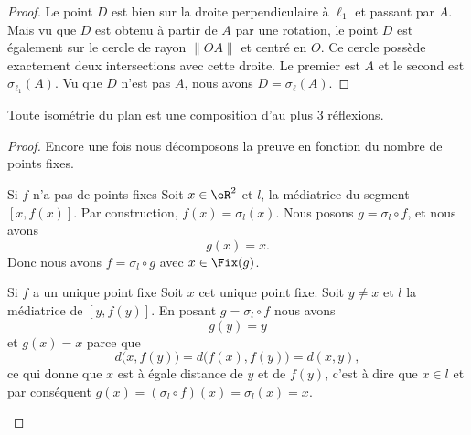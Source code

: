\begin{proof}
    Le point \( D\) est bien sur la droite perpendiculaire à \( \ell_1\) et passant par \( A\). Mais vu que \( D\) est obtenu à partir de \( A\) par une rotation, le point \( D\) est également sur le cercle de rayon \( \| OA \|\) et centré en \( O\). Ce cercle possède exactement deux intersections avec cette droite. Le premier est \( A\) et le second est \( \sigma_{\ell_1}(A)\). Vu que \( D\) n'est pas \( A\), nous avons \( D=\sigma_{\ell}(A)\).
\end{proof}


\begin{theorem}
    Toute isométrie du plan est une composition d'au plus \( 3\) réflexions. 
\end{theorem}

\begin{proof}
    Encore une fois nous décomposons la preuve en fonction du nombre de points fixes.
    \begin{subproof}
        \item[Si \( f\) n'a pas de points fixes]
            Soit \( x\in \eR^2\) et \( l\), la médiatrice du segment \( [x,f(x)]\). Par construction, \( f(x)=\sigma_l(x)\). Nous posons \( g=\sigma_l\circ f\), et nous avons
            \begin{equation}
                g(x)=x.
            \end{equation}
            Donc nous avons \( f=\sigma_l\circ g\) avec \( x\in\Fix(g)\).
        \item[Si \( f\) a un unique point fixe]
            Soit \( x\) cet unique point fixe. Soit \( y\neq x\) et \( l\) la médiatrice de \( [y,f(y)]\). En posant \( g=\sigma_l\circ f\) nous avons 
            \begin{equation}
                g(y)=y
            \end{equation}
            et \( g(x)=x\) parce que
            \begin{equation}
                d\big( x,f(y) \big)=d\big( f(x),f(y) \big)=d(x,y),
            \end{equation}
            ce qui donne que \( x\) est à égale distance de \( y\) et de \( f(y)\), c'est à dire que \( x\in l\) et par conséquent \( g(x)=(\sigma_l\circ f)(x)=\sigma_l(x)=x\). 


\end{subproof}
\end{proof}
